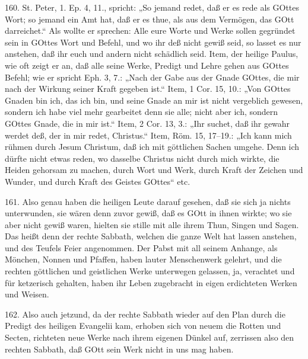 160. St. Peter, 1. Ep. 4, 11., spricht: „So jemand redet, daß er es rede als GOttes Wort; so jemand ein Amt hat, daß er es thue, als aus dem Vermögen, das GOtt darreichet.“ Als wollte er sprechen: Alle eure Worte und Werke sollen gegründet sein in GOttes Wort und Befehl, und wo ihr deß nicht gewiß seid, so lasset es nur anstehen, daß ihr euch und andern nicht schädlich seid. Item, der heilige Paulus, wie oft zeigt er an, daß alle seine Werke, Predigt und Lehre gehen aus GOttes Befehl; wie er spricht Eph. 3, 7.: „Nach der Gabe aus der Gnade GOttes, die mir nach der Wirkung seiner Kraft gegeben ist.“ Item, 1 Cor. 15, 10.: „Von GOttes Gnaden bin ich, das ich bin, und seine Gnade an mir ist nicht vergeblich gewesen, sondern ich habe viel mehr gearbeitet denn sie alle; nicht aber ich, sondern GOttes Gnade, die in mir ist.“ Item, 2 Cor. 13, 3.: „Ihr suchet, daß ihr gewahr werdet deß, der in mir redet, Christus.“ Item, Röm. 15, 17–19.: „Ich kann mich rühmen durch Jesum Christum, daß ich mit göttlichen Sachen umgehe. Denn ich dürfte nicht etwas reden, wo dasselbe Christus nicht durch mich wirkte, die Heiden gehorsam zu machen, durch Wort und Werk, durch Kraft der Zeichen und Wunder, und durch Kraft des Geistes GOttes“ etc.

161. Also genau haben die heiligen Leute darauf gesehen, daß sie sich ja nichts unterwunden, sie wären denn zuvor gewiß, daß es GOtt in ihnen wirkte; wo sie aber nicht gewiß waren, hielten sie stille mit alle ihrem Thun, Singen und Sagen. Das heißt denn der rechte Sabbath, welchen die ganze Welt hat lassen anstehen, und des Teufels Feier angenommen. Der Pabst mit all seinem Anhange, als Mönchen, Nonnen und Pfaffen, haben lauter Menschenwerk gelehrt, und die rechten göttlichen und geistlichen Werke unterwegen gelassen, ja, verachtet und für ketzerisch gehalten, haben ihr Leben zugebracht in eigen erdichteten Werken und Weisen.

162. Also auch jetzund, da der rechte Sabbath wieder auf den Plan durch die Predigt des heiligen Evangelii kam, erhoben sich von neuem die Rotten und Secten, richteten neue Werke nach ihrem eigenen Dünkel auf, zerrissen also den rechten Sabbath, daß GOtt sein Werk nicht in uns mag haben.

